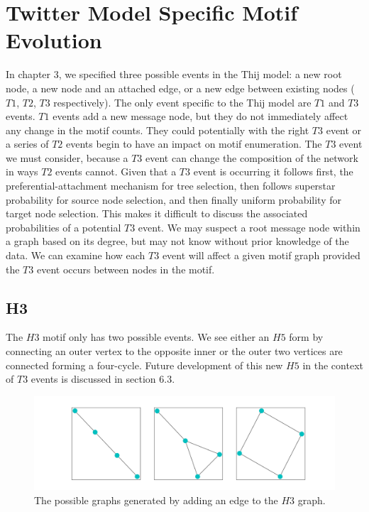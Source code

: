 \chapter{Twitter Model Specific Motif Evolution}

In chapter 3, we specified three possible
events in the Thij model: a new root node, a new node and an attached edge, or a new edge between existing nodes 
($T1$, $T2$, $T3$ respectively). The only event specific to the Thij model are $T1$ and $T3$ events. 
$T1$ events add a new message node, but they do not immediately affect any change in the motif counts.
They could potentially with the right $T3$ event or a series of $T2$ events begin to have an impact on motif enumeration.
 The $T3$ event we must consider, because a $T3$ event can change the composition of the network in ways $T2$ events cannot. Given that a $T3$ event is
occurring it follows first, the preferential-attachment mechanism for tree selection, then follows superstar 
probability for source node selection, and then finally uniform probability for target node selection.
This makes it difficult
to discuss the associated probabilities of a potential $T3$ event. We may suspect
a root message node within a graph based on its degree, but may not know without prior knowledge
of the data. We can examine how each $T3$ event will affect a given motif graph provided the $T3$
event occurs between nodes in the motif.

\section{H3}
The $H3$ motif only has two possible events. We see either an $H5$ form by connecting
an outer vertex to the opposite inner or the outer two vertices are connected
forming a four-cycle. Future development of this new $H5$ in the context of 
$T3$ events is discussed in section 6.3. 

\begin{figure}[!ht]
    \includegraphics[width=15cm]{Images/H3_T3_evolution.png}
    \centering
    \caption{The possible graphs generated by adding an edge to the $H3$ graph.}
\end{figure}

